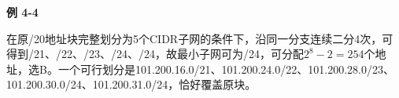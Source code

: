 {\color{ink}\bfseries 例 4-4}\par\vspace{1bp}在原/\allowbreak{}20地址块完整划分为5个CIDR子网的条件下，沿同一分支连续二分4次，可得到/\allowbreak{}21、/\allowbreak{}22、/\allowbreak{}23、/\allowbreak{}24、/\allowbreak{}24，故最小子网可为/\allowbreak{}24，可分配\(2^{8}-2=\allowbreak{}254\)个地址，选B。一个可行划分是101.200.16.0/\allowbreak{}21、101.200.24.0/\allowbreak{}22、101.200.28.0/\allowbreak{}23、101.200.30.0/\allowbreak{}24、101.200.31.0/\allowbreak{}24，恰好覆盖原块。
